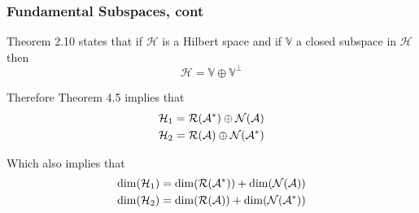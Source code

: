 \documentclass{beamer}
\begin{document}
\begin{frame}\frametitle{Fundamental Subspaces, cont}
	Theorem 2.10 states that if $\mathcal{H}$ is a Hilbert space and if $\mathbb{V}$ a closed subspace in $\mathcal{H}$ then
	\[ \mathcal{H} = \mathbb{V} \oplus \mathbb{V}^{\perp} \]
	
	\vfill
	
	Therefore Theorem 4.5 implies that
	\begin{align*}
		\mathcal{H}_1 &= \mathcal{R}(\mathcal{A}^\ast) \oplus \mathcal{N}(\mathcal{A}) \\
		\mathcal{H}_2 &= \mathcal{R}(\mathcal{A}) \oplus \mathcal{N}(\mathcal{A}^\ast)
	\end{align*}
	
	\vfill
	
	Which also implies that
	\begin{align*}
		\dim(\mathcal{H}_1) &= \dim(\mathcal{R}(\mathcal{A}^\ast)) + \dim(\mathcal{N}(\mathcal{A})) \\
		\dim(\mathcal{H}_2) &= \dim(\mathcal{R}(\mathcal{A})) + \dim(\mathcal{N}(\mathcal{A}^\ast))
	\end{align*}
\end{frame}
\end{document}
